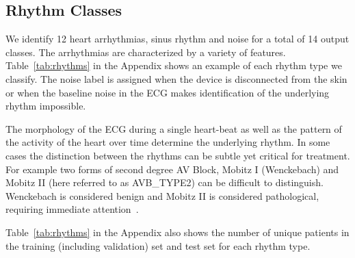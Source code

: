 \subsection*{Rhythm Classes}
We identify 12 heart arrhythmias, sinus rhythm and noise for a total of 14
output classes. The arrhythmias are characterized by a variety of features.
Table~\ref{tab:rhythms} in the Appendix shows an example of each rhythm type we
classify. The noise label is assigned when the device is disconnected from the
skin or when the baseline noise in the ECG makes identification of the
underlying rhythm impossible.

The morphology of the ECG during a single heart-beat as well as the pattern of
the activity of the heart over time determine the underlying rhythm. In some
cases the distinction between the rhythms can be subtle yet critical for
treatment. For example two forms of second degree AV Block, Mobitz I
(Wenckebach) and Mobitz II (here referred to as AVB\_TYPE2) can be difficult to
distinguish. Wenckebach is considered benign and Mobitz II is considered
pathological, requiring immediate attention~\cite{dubin1996rapid}. 

Table~\ref{tab:rhythms} in the Appendix also shows the number of unique
patients in the training (including validation) set and test set for each
rhythm type.
